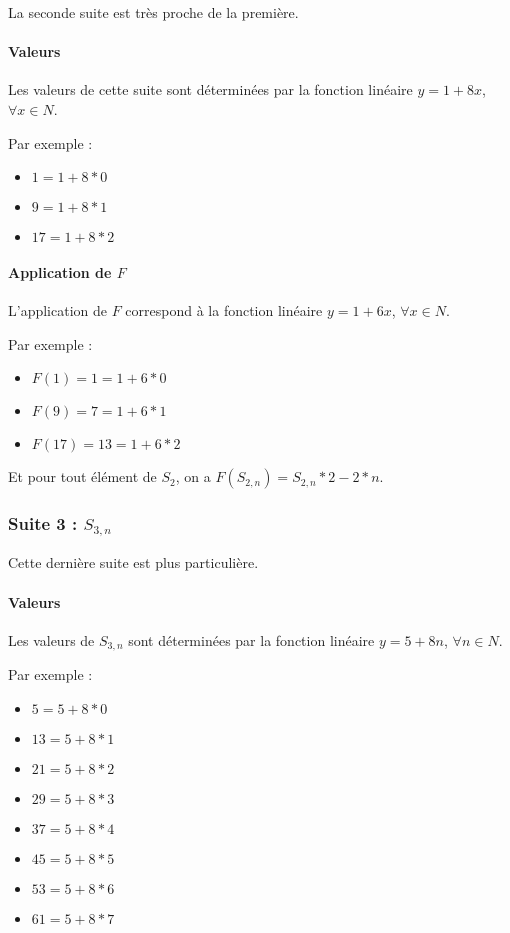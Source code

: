 \documentclass{book}
\begin{document}
La seconde suite est tr\`es proche de la premi\`ere.

\paragraph{Valeurs}

Les valeurs de cette suite sont d\'etermin\'ees par la fonction lin\'eaire $y = 1 + 8x$, $\forall x \in N$.

Par exemple :

\begin{itemize}
	\item $1 = 1 + 8 * 0$
	\item $9 = 1 + 8 * 1$
	\item $17 = 1 + 8 * 2$
\end{itemize}

\paragraph{Application de $F$}

L'application de $F$ correspond \`a la fonction lin\'eaire $y = 1 + 6x$, $\forall x \in N$.

Par exemple :

\begin{itemize}
	\item $F(1) = 1 = 1 + 6 * 0$
	\item $F(9) = 7 = 1 + 6 * 1$
	\item $F(17) = 13 = 1 + 6 * 2$
\end{itemize}

Et pour tout \'el\'ement de $S_2$, on a $F(S_{2,n}) = S_{2,n} * 2  - 2 * n$.

\subsubsection{Suite 3 : $S_{3,n}$}

Cette derni\`ere suite est plus particuli\`ere.

\paragraph{Valeurs}

Les valeurs de $S_{3,n}$ sont d\'etermin\'ees par la fonction lin\'eaire $y = 5 + 8n$, $\forall n \in N$.

Par exemple :

\begin{itemize}
	\item $5 = 5 + 8 * 0$
	\item $13 = 5 + 8 * 1$
	\item $21 = 5 + 8 * 2$
	\item $29 = 5 + 8 * 3$
	\item $37 = 5 + 8 * 4$
	\item $45 = 5 + 8 * 5$
	\item $53 = 5 + 8 * 6$
	\item $61 = 5 + 8 * 7$
\end{itemize}
\end{document}

